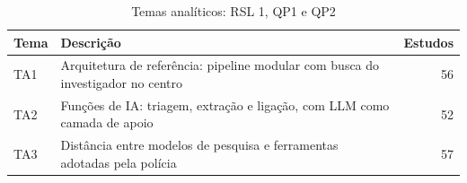 \begin{table}[htbp]
\centering
\caption{Temas analíticos: RSL 1, QP1 e QP2}
\label{tab:temas-A1}
\small
\begin{tabular}{lp{11cm}r}
\hline
\textbf{Tema} & \textbf{Descrição} & \textbf{Estudos} \\
\hline
TA1 & Arquitetura de referência: pipeline modular com busca do investigador no centro & 56 \\
TA2 & Funções de IA: triagem, extração e ligação, com LLM como camada de apoio & 52 \\
TA3 & Distância entre modelos de pesquisa e ferramentas adotadas pela polícia & 57 \\
\hline
\end{tabular}
\end{table}
